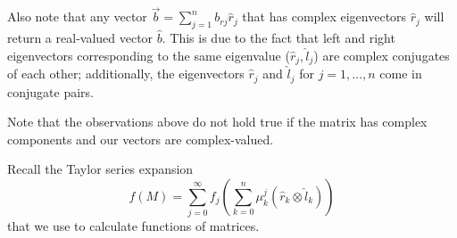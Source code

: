 \documentclass[a4paper, 12pt,oneside,openany]{book}
\begin{document}
Also note that any vector $\vec{b} = \sum\limits_{j=1}^n b_{rj} \hat{r}_j$ that has complex eigenvectors $\hat{r}_j$ will return a real-valued vector $\hat{b}$. This is due to the fact that left and right eigenvectors corresponding to the same eigenvalue ($\hat{r}_j, \hat{l}_j$) are complex conjugates of each other; additionally, the eigenvectors $\hat{r}_j$ and $\hat{l}_j$ for $j=1, \dots, n$ come in conjugate pairs. 

Note that the observations above do not hold true if the matrix has complex components and our vectors are complex-valued.

Recall the Taylor series expansion $$f(M) =\sum\limits_{j=0}^\infty f_j \left(\sum\limits_{k=0}^n \mu_k^j (\hat{r}_k \otimes \hat{l}_k) \right)$$ that we use to calculate functions of matrices.

\end{document}
